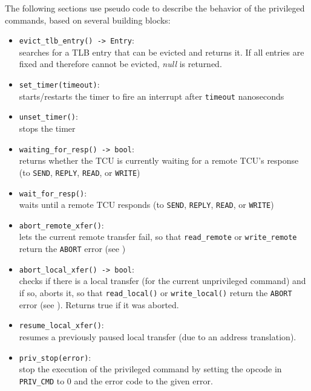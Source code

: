 The following sections use pseudo code to describe the behavior of the privileged commands, based on
several building blocks:

\begin{itemize}
  \item \texttt{evict\_tlb\_entry() -> Entry}: \\
  searches for a TLB entry that can be evicted and returns it. If all entries are fixed and
  therefore cannot be evicted, \emph{null} is returned.\extend{}
  \item \texttt{set\_timer(timeout)}: \\
  starts/restarts the timer to fire an interrupt after \texttt{timeout} nanoseconds
  \item \texttt{unset\_timer()}:\\
  stops the timer
  \item \texttt{waiting\_for\_resp() -> bool}:\\
  returns whether the TCU is currently waiting for a remote TCU's response (to \texttt{SEND},
  \texttt{REPLY}, \texttt{READ}, or \texttt{WRITE})
  \item \texttt{wait\_for\_resp()}:\\
  waits until a remote TCU responds (to \texttt{SEND}, \texttt{REPLY}, \texttt{READ}, or
  \texttt{WRITE})
  \item \texttt{abort\_remote\_xfer()}:\\
  lets the current remote transfer fail, so that \texttt{read\_remote} or \texttt{write\_remote}
  return the \texttt{ABORT} error (see )
  \item \texttt{abort\_local\_xfer() -> bool}:\\
  checks if there is a local transfer (for the current unprivileged command) and if so, aborts it,
  so that \texttt{read\_local()} or \texttt{write\_local()} return the \texttt{ABORT} error (see
  ). Returns true if it was aborted.
  \item \texttt{resume\_local\_xfer()}:\\
  resumes a previously paused local transfer (due to an address translation). \extend{}
  \item \texttt{priv\_stop(error)}: \\
  stop the execution of the privileged command by setting the opcode in \texttt{PRIV\_CMD} to 0 and
  the error code to the given error. \extend{}
\end{itemize}

